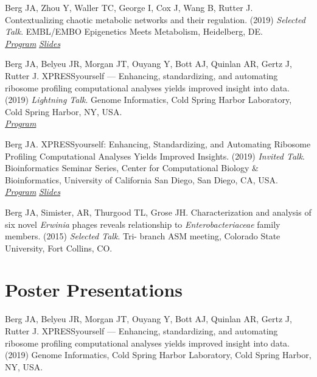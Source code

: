 \documentclass[margin,line]{res}
\begin{document}
\begin{resume}
Berg JA, Zhou Y, Waller TC, George I, Cox J, Wang B, Rutter J. Contextualizing chaotic metabolic networks and their regulation. (2019) \textit{Selected Talk}. EMBL/EMBO Epigenetics Meets Metabolism, Heidelberg, DE. \\
\hspace*{12pt} \textit{\href{https://www.embo-embl-symposia.org/symposia/2019/EES19-11/programme/index.html}{Program}}
\hspace*{12pt} \textit{\href{https://github.com/j-berg/presentations/blob/master/22_nov_2019_metabolism_meets_epigenetics_metaboverse.pdf}{Slides}}

Berg JA, Belyeu JR, Morgan JT, Ouyang Y, Bott AJ, Quinlan AR, Gertz J, Rutter J. XPRESSyourself — Enhancing, standardizing, and automating ribosome profiling computational analyses yields improved insight into data. (2019) \textit{Lightning Talk}. Genome Informatics, Cold Spring Harbor Laboratory, Cold Spring Harbor, NY, USA. \\
\hspace*{12pt} \textit{\href{https://meetings.cshl.edu/abstracts.aspx?meet=INFO&year=19}{Program}}

Berg JA. XPRESSyourself: Enhancing, Standardizing, and Automating Ribosome Profiling Computational Analyses Yields Improved Insights. (2019) \textit{Invited Talk}. Bioinformatics Seminar Series, Center for Computational Biology \& Bioinformatics, University of California San Diego, San Diego, CA, USA. \\
\hspace*{12pt} \textit{\href{http://compbio.ucsd.edu/outreach/bioinformatics-seminar-series/}{Program}}
\hspace*{12pt} \textit{\href{https://github.com/j-berg/presentations/blob/master/07_oct_2019_ucsd_ccbb_xpressyourself.pdf}{Slides}}

Berg JA, Simister, AR, Thurgood TL, Grose JH. Characterization and analysis of six novel \textit{Erwinia} phages reveals relationship to \textit{Enterobacteriaceae} family members. (2015) \textit{Selected Talk}. Tri- branch ASM meeting, Colorado State University, Fort Collins, CO.


\section{\sc Poster Presentations}
%
%

Berg JA, Belyeu JR, Morgan JT, Ouyang Y, Bott AJ, Quinlan AR, Gertz J, Rutter J. XPRESSyourself — Enhancing, standardizing, and automating ribosome profiling computational analyses yields improved insight into data. (2019) Genome Informatics, Cold Spring Harbor Laboratory, Cold Spring Harbor, NY, USA.


\end{resume}
\end{document}
